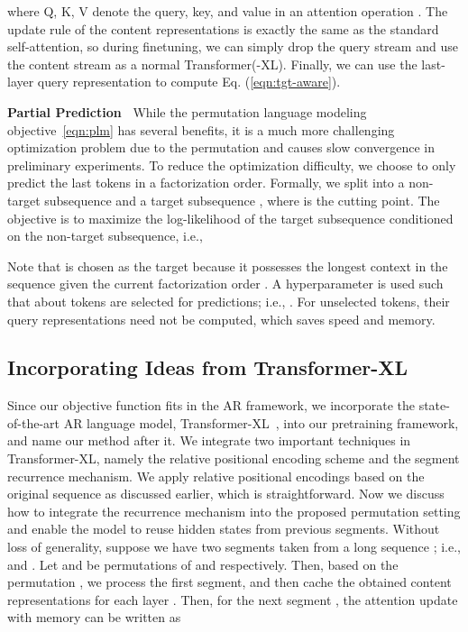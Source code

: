 \documentclass{article}
\begin{document}
where Q, K, V denote the query, key, and value in an attention operation \cite{vaswani2017attention}.
The update rule of the content representations is exactly the same as the standard self-attention, so during finetuning, we can simply drop the query stream and use the content stream as a normal Transformer(-XL).
Finally, we can use the last-layer query representation  to compute Eq. (\ref{eqn:tgt-aware}).




\textbf{Partial Prediction~}
While the permutation language modeling objective~\eqref{eqn:plm} has several benefits, it is a much more challenging optimization problem due to the permutation and causes slow convergence in preliminary experiments. To reduce the optimization difficulty, we choose to only predict the last tokens in a factorization order. Formally, we split  into a non-target subsequence  and a target subsequence , where  is the cutting point. The objective is to maximize the log-likelihood of the target subsequence conditioned on the non-target subsequence, i.e.,

Note that  is chosen as the target because it possesses the longest context in the sequence given the current factorization order .
A hyperparameter  is used such that about  tokens are selected for predictions; i.e., . For unselected tokens, their query representations need not be computed, which saves speed and memory.





\subsection{Incorporating Ideas from Transformer-XL}
\label{sec:xl}

Since our objective function fits in the AR framework, 
we incorporate the state-of-the-art AR language model, Transformer-XL~\cite{dai2019transformer}, into our pretraining framework, and name our method after it.
We integrate two important techniques in Transformer-XL, namely the relative positional encoding scheme and the segment recurrence mechanism.
We apply relative positional encodings based on the original sequence as discussed earlier, which is straightforward.
Now we discuss how to integrate the recurrence mechanism into the proposed permutation setting and enable the model to reuse hidden states from previous segments. 
Without loss of generality, suppose we have two segments taken from a long sequence ; i.e.,  and . Let  and  be permutations of  and  respectively. 
Then, based on the permutation , we process the first segment, and then cache the obtained content representations  for each layer . 
Then, for the next segment , the attention update with memory can be written as
\end{document}
